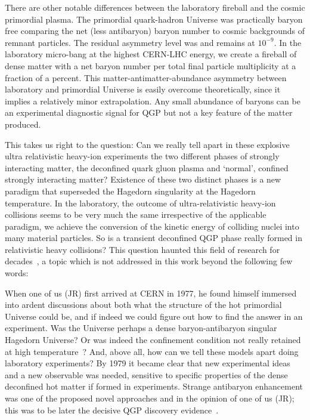 There are other notable differences between the laboratory fireball and the cosmic primordial plasma. The primordial quark-hadron Universe was practically baryon free comparing the net (less antibaryon) baryon number to cosmic backgrounds of remnant particles. The residual asymmetry level was and remains at $10^{-9}$. In the laboratory micro-bang at the highest CERN-LHC energy, we create a fireball of dense matter with a net baryon number per total final particle multiplicity at a fraction of a percent. This matter-antimatter-abundance asymmetry between laboratory and primordial Universe is easily overcome theoretically, since it implies a relatively minor extrapolation. Any small abundance of baryons can be an experimental diagnostic signal for QGP but not a key feature of the matter produced.

This takes us right to the question: Can we really tell apart in these explosive ultra relativistic heavy-ion experiments the two different phases of strongly interacting matter, the deconfined quark gluon plasma and `normal', confined strongly interacting matter? Existence of these two distinct phases is a new paradigm that superseded the Hagedorn singularity at the Hagedorn temperature. In the laboratory, the outcome of ultra-relativistic heavy-ion collisions seems to be very much the same irrespective of the applicable paradigm, we achieve the conversion of the kinetic energy of colliding nuclei into many material particles. So is a transient deconfined QGP phase really formed in relativistic heavy collisions? This question haunted this field of research for decades~\cite{Rafelski:2015cxa,Harris:2024aov}, a topic which is not addressed in this work beyond the following few words: 

When one of us (JR) first arrived at CERN in 1977, he found himself immersed into ardent discussions about both what the structure of the hot primordial Universe could be, and if indeed we could figure out how to find the answer in an experiment. Was the Universe perhaps a dense baryon-antibaryon singular Hagedorn Universe? Or was indeed the confinement condition not really retained at high temperature~\cite{Weinberg:1974hy,Harrington:1974fc,Cabibbo:1975ig}? And, above all, how can we tell these models apart doing laboratory experiments? By 1979 it became clear that new experimental ideas and a new observable was needed, sensitive to specific properties of the dense deconfined hot matter if formed in experiments. Strange antibaryon enhancement was one of the proposed novel approaches and in the opinion of one of us (JR); this was to be later the decisive QGP discovery evidence~\cite{Rafelski:2019twp}.


